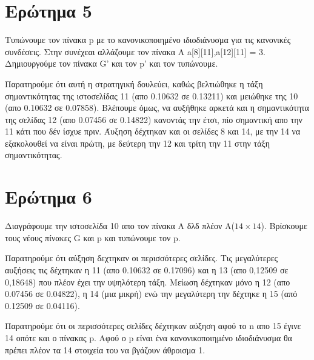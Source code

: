 \documentclass{article}
\begin{document}
    \section{Ερώτημα 5}
        Τυπώνουμε τον πίνακα p με το κανονικοποιημένο ιδιοδιάνυσμα για τις κα\-νο\-νι\-κές
        συνδέσεις.
        Στην συνέχεαι αλλάζουμε τον πίνακα Α a[8][11],a[12][11] = 3. Δημιουργούμε τον πίνακα G' και τον p' και τον τυπώνουμε.
        
        Παρατηρούμε ότι αυτή η στρατηγική δουλεύει, καθώς βελτιώθηκε η τάξη σημαντικότητας της ιστοσελίδας 11 (απο 0.10632 σε 0.13211) και μειώθηκε της 10 (απο 0.10632 σε 0.07858).
        Βλέπουμε όμως, να αυξήθηκε αρκετά και η σημαντικότητα της σελίδας 12 (απο 0.07456 σε 0.14822) κανοντάς την έτσι, πίο σημαντική απο την 11 κάτι που δέν ίσχυε πριν. 
        Άυξηση δέχτηκαν και οι σελίδες 8 και 14, με την 14 να εξακολουθεί να είναι πρώτη, με δεύτερη την 12 και τρίτη την 11 στην τάξη σημαντικότητας.
        
    \section{Ερώτημα 6}
    Διαγράφουμε την ιστοσελίδα 10 απο τον πίνακα Α δλδ πλέον Α($14\times14$).
    Βρίσκουμε τους νέους πίνακες G και p και τυπώνουμε τον p.
    
    Παρατηρούμε ότι αύξηση δεχτηκαν οι περισσότερες σελίδες. Τις μεγαλύτερες αυξήσεις τις δέχτηκαν η 11 (απο 0.10632 σε 0.17096) και η 13 (απο 0,12509 σε 0,18648) που πλέον έχει την υψηλότερη τάξη.
    Μείωση δέχτηκαν μόνο η 12 (απο 0.07456 σε 0.04822), η 14 (μια μικρή) ενώ την μεγαλύτερη την δέχτηκε η 15 (από 0.12509 σε 0.04116).
    
    Παρατηρούμε ότι οι περισσότερες σελίδες δέχτηκαν αύξηση αφού το n απο 15 έγινε 14 οπότε και ο πίνακας p. 
    Αφού ο p είναι ένα κανονικοποιημένο ιδιοδιάνυσμα θα πρέπει πλέον τα 14 στοιχεία του να βγάζουν άθροισμα 1.
    
\end{document}
